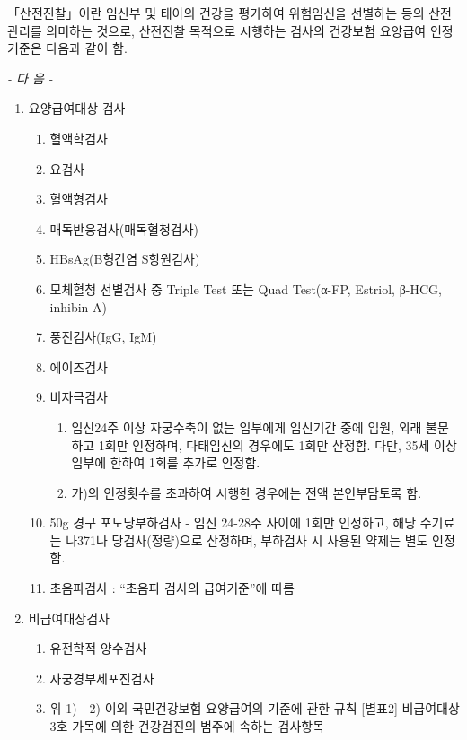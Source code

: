 {
「산전진찰」이란 임신부 및 태아의 건강을 평가하여 위험임신을 선별하는 등의 산전관리를 의미하는 것으로, 산전진찰 목적으로 시행하는 검사의 건강보험 요양급여 인정기준은 다음과 같이 함.\par
                                     \begin{center}\emph{         - 다   음 -}\end{center}
\begin{enumerate}[가.]\tightlist
\item 요양급여대상 검사
	\begin{enumerate}[1)]\tightlist
	\item 혈액학검사 
	\item 요검사
	\item 혈액형검사
	\item 매독반응검사(매독혈청검사)
	\item HBsAg(B형간염 S항원검사)
	\item 모체혈청 선별검사 중 Triple Test 또는 Quad Test(α-FP, Estriol, β-HCG, inhibin-A)
	\item 풍진검사(IgG, IgM)
	\item 에이즈검사
	\item 비자극검사
		\begin{enumerate}[가)]\tightlist
		\item 임신24주 이상 자궁수축이 없는 임부에게 임신기간 중에 입원, 외래 불문하고 1회만 인정하며, 다태임신의 경우에도 1회만 산정함. 다만, 35세 이상 임부에 한하여 1회를 추가로 인정함. 
		\item 가)의 인정횟수를 초과하여 시행한 경우에는 전액 본인부담토록 함.
		\end{enumerate} 
	\item 50g 경구 포도당부하검사
     - 임신 24-28주 사이에 1회만 인정하고, 해당 수기료는 나371나 당검사(정량)으로 산정하며, 부하검사 시 사용된 약제는 별도
       인정함.
	\item 초음파검사 :    “초음파 검사의 급여기준”에 따름
	\end{enumerate}
\item 비급여대상검사
	\begin{enumerate}[1)]\tightlist
	\item 유전학적 양수검사
	\item 자궁경부세포진검사
	\item 위 1) - 2) 이외 국민건강보험 요양급여의 기준에 관한 규칙 [별표2] 비급여대상 3호 가목에 의한 건강검진의 범주에 속하는 
     검사항목
     \end{enumerate}
\end{enumerate}
}%

